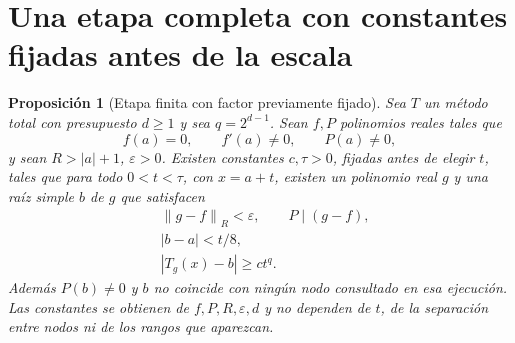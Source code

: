 \documentclass[11pt,a4paper]{article}
\numberwithin{equation}{section}
\newtheorem{proposition}[theorem]{Proposición}
\theoremstyle{definition}
\theoremstyle{remark}
\newcommand{\norm}[1]{\left\lVert#1\right\rVert}
\begin{document}
\clearpage
\section{Una etapa completa con constantes fijadas antes de la escala}\label{sec:stage}

\begin{proposition}[Etapa finita con factor previamente fijado]\label{prop:stage}
Sea $T$ un método total con presupuesto $d\ge1$ y sea $q=2^{d-1}$. Sean $f,P$ polinomios reales tales que
\[
f(a)=0,\qquad f'(a)\ne0,\qquad P(a)\ne0,
\]
y sean $R>|a|+1$, $\varepsilon>0$. Existen constantes $c,\tau>0$, fijadas antes de elegir $t$, tales que para todo $0<t<\tau$, con $x=a+t$, existen un polinomio real $g$ y una raíz simple $b$ de $g$ que satisfacen
\begin{align}
&\norm{g-f}_R<\varepsilon,\qquad P\mid(g-f),\label{eq:stage1}\\
&|b-a|<t/8,\label{eq:stage2}\\
&|T_g(x)-b|\ge c t^q.\label{eq:stage3}
\end{align}
Además $P(b)\ne0$ y $b$ no coincide con ningún nodo consultado en esa ejecución. Las constantes se obtienen de $f,P,R,\varepsilon,d$ y no dependen de $t$, de la separación entre nodos ni de los rangos que aparezcan.
\end{proposition}
\end{document}
